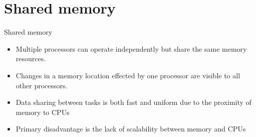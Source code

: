 \documentclass[10pt,times]{beamer}
\begin{document}
\section{Shared memory}
\begin{frame}{Shared memory}
\begin{itemize}
\item Multiple processors can operate independently but share the same memory 
resources.

\item Changes in a memory location effected by one processor are visible to all 
other processors. 

\item Data sharing between tasks is both fast and uniform due to the proximity of 
memory to CPUs 

\item Primary disadvantage is the lack of scalability between memory and CPUs
\end{itemize}


\end{frame}
\end{document}
